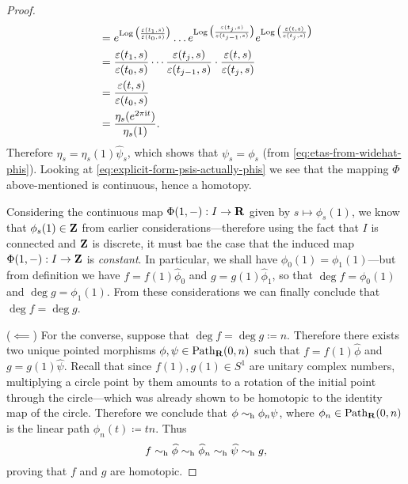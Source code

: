 \begin{proof}
\begin{align*}
                    & = e^{\operatorname{Log} \big( \frac{\varepsilon(t_1, s)}{\varepsilon(t_0, s)} \big)}
        \dots
        e^{\operatorname{Log} \big( \frac{\varepsilon(t_j, s)}{\varepsilon(t_{j-1}, s)} \big)}
        e^{\operatorname{Log} \big( \frac{\varepsilon(t, s)}{\varepsilon(t_j, s)} \big)}                   \\
                    & = \frac{\varepsilon(t_1, s)}{\varepsilon(t_0, s)}
        \cdots
        \frac{\varepsilon(t_j, s)}{\varepsilon(t_{j-1}, s)}
        \cdot
        \frac{\varepsilon(t, s)}{\varepsilon(t_j, s)}                                        \\
                    & = \frac{\varepsilon(t, s)}{\varepsilon(t_0, s)}                        \\
                    & = \frac{\eta_s(e^{2 \pi \text{i} t})}{\eta_s(1)}.
    \end{align*}
    Therefore \(\eta_s = \eta_s(1) \widehat \psi_s\), which shows that
    \(\psi_s = \phi_s\) (from \cref{eq:etas-from-widehat-phis}). Looking at
    \cref{eq:explicit-form-psis-actually-phis} we see that the mapping \(\Phi\)
    above-mentioned is continuous, hence a homotopy.

    Considering the continuous map \(\Phi(1, -): I \to \mathbf{R}\) given by
    \(s \mapsto \phi_s(1)\), we know that \(\phi_s(1) \in \mathbf{Z}\) from earlier
    considerations---therefore using the fact that \(I\) is connected and \(\mathbf{Z}\) is
    discrete, it must bae the case that the induced map \(\Phi(1, -): I \to \mathbf{Z}\) is
    \emph{constant}. In particular, we shall have \(\phi_0(1) = \phi_1(1)\)---but
    from definition we have \(f = f(1) \widehat \phi_0\) and
    \(g = g(1) \widehat \phi_1\), so that \(\deg f = \phi_0(1)\) and
    \(\deg g = \phi_1(1)\). From these considerations we can finally conclude that
    \(\deg f = \deg g\).

    (\(\impliedby\)) For the converse, suppose that \(\deg f = \deg g \coloneq
    n\). Therefore there exists two unique pointed morphisms
    \(\phi, \psi \in \operatorname{Path}_{\mathbf{R}}(0, n)\) such that \(f = f(1) \widehat \phi\) and
    \(g = g(1) \widehat \psi\). Recall that since \(f(1), g(1) \in S^1\) are unitary
    complex numbers, multiplying a circle point by them amounts to a rotation of the
    initial point through the circle---which was already shown to be homotopic to
    the identity map of the circle. Therefore we conclude that
    \(\phi \sim_{\text{h}} \phi_n \psi\), where \(\phi_n \in \operatorname{Path}_{\mathbf{R}}(0, n)\) is the linear
    path \(\phi_n(t) \coloneq t n\). Thus
    \[
        f \sim_{\text{h}} \widehat \phi
        \sim_{\text{h}} \widehat \phi_n
        \sim_{\text{h}} \widehat \psi
        \sim_{\text{h}} g,
    \]
    proving that \(f\) and \(g\) are homotopic.
\end{proof}

